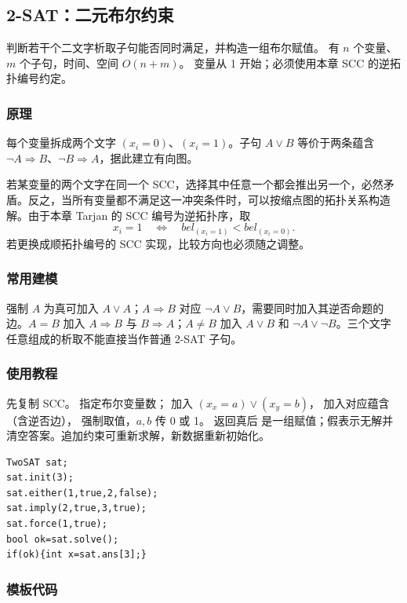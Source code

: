 \subsection{2-SAT：二元布尔约束}
\label{algo:two-sat}
\AlgorithmInfo
    {判断若干个二文字析取子句能否同时满足，并构造一组布尔赋值。}
    {有 $n$ 个变量、$m$ 个子句，时间、空间 $O(n+m)$。}
    {变量从 1 开始；必须使用本章 SCC 的逆拓扑编号约定。}

\subsubsection*{原理}
每个变量拆成两个文字 $(x_i=0)$、$(x_i=1)$。子句 $A\lor B$ 等价于两条蕴含 $\neg A\Rightarrow B$、$\neg B\Rightarrow A$，据此建立有向图。

若某变量的两个文字在同一个 SCC，选择其中任意一个都会推出另一个，必然矛盾。反之，当所有变量都不满足这一冲突条件时，可以按缩点图的拓扑关系构造解。由于本章 Tarjan 的 SCC 编号为逆拓扑序，取
\[
    x_i=1\quad\Longleftrightarrow\quad
    bel_{(x_i=1)}<bel_{(x_i=0)}.
\]
若更换成顺拓扑编号的 SCC 实现，比较方向也必须随之调整。

\subsubsection*{常用建模}
强制 $A$ 为真可加入 $A\lor A$；$A\Rightarrow B$ 对应 $\neg A\lor B$，需要同时加入其逆否命题的边。$A=B$ 加入 $A\Rightarrow B$ 与 $B\Rightarrow A$；$A\ne B$ 加入 $A\lor B$ 和 $\neg A\lor\neg B$。三个文字任意组成的析取不能直接当作普通 2-SAT 子句。

\subsubsection*{使用教程}
先复制 SCC。 指定布尔变量数； 加入 $(x_x=a)\lor(x_y=b)$， 加入对应蕴含（含逆否边）， 强制取值，$a,b$ 传 0 或 1。 返回真后  是一组赋值；假表示无解并清空答案。追加约束可重新求解，新数据重新初始化。
\begin{lstlisting}[style=mtycpp,numbers=none]
TwoSAT sat;
sat.init(3);
sat.either(1,true,2,false);
sat.imply(2,true,3,true);
sat.force(1,true);
bool ok=sat.solve();
if(ok){int x=sat.ans[3];}
\end{lstlisting}

\subsubsection*{模板代码}
